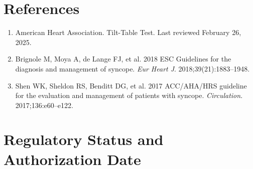 \section*{References}
\begin{enumerate}
  \item American Heart Association. Tilt-Table Test. Last reviewed February 26, 2025.
  \item Brignole M, Moya A, de Lange FJ, et al. 2018 ESC Guidelines for the diagnosis and management of syncope. \textit{Eur Heart J}. 2018;39(21):1883--1948.
  \item Shen WK, Sheldon RS, Benditt DG, et al. 2017 ACC/AHA/HRS guideline for the evaluation and management of patients with syncope. \textit{Circulation}. 2017;136:e60--e122.
\end{enumerate}

\clearpage
\section*{Regulatory Status and Authorization Date}

\clearpage
